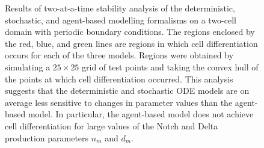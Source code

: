 \documentclass{article}
\begin{document}
\begin{flushleft}
\begin{figure}[!ht]
   \caption{Results of two-at-a-time stability analysis of the deterministic, stochastic, and agent-based modelling formalisms on a two-cell domain with periodic boundary conditions. The regions enclosed by the red, blue, and green lines are regions in which cell differentiation occurs for each of the three models. Regions were obtained by simulating a $25 \times 25$ grid of test points and taking the convex hull of the points at which cell differentiation occurred. This analysis suggests that the deterministic and stochastic ODE models are on average less sensitive to changes in parameter values than the agent-based model. In particular, the agent-based model does not achieve cell differentiation for large values of the Notch and Delta production parameters $n_{m}$ and $d_{m}$.} 
\end{figure}


\end{flushleft}
\end{document}
